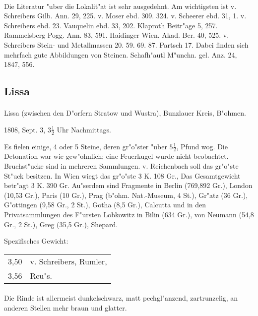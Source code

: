 \documentclass[a4paper, 11pt, oneside]{article}
\begin{document}
\paragraph{}
Die Literatur "uber die Lokalit"at ist sehr ausgedehnt. Am wichtigsten ist v. Schreibers Gilb. Ann. 29, 225. v. Moser ebd. 309. 324. v. Scheerer ebd. 31, 1. v. Schreibers ebd. 23. Vauquelin ebd. 33, 202. Klaproth Beitr"age 5, 257. Rammelsberg Pogg. Ann. 83, 591. Haidinger Wien. Akad. Ber. 40, 525. v. Schreibers Stein- und Metallmassen 20. 59. 69. 87. Partsch 17. Dabei finden sich mehrfach gute Abbildungen von Steinen. Schafh"autl M"unchn. gel. Anz. 24, 1847, 556.
\subsection{Lissa}
\normalsize
\paragraph{}
Lissa (zwischen den D"orfern Stratow und Wustra), Bunzlauer Kreis, B"ohmen.

1808, Sept. 3, $3\frac{1}{2}$ Uhr Nachmittags.

Es fielen einige, 4 oder 5 Steine, deren gr"o"ster "uber $5\frac{1}{2}$, Pfund wog. Die Detonation war wie gew"ohnlich; eine Feuerkugel wurde nicht beobachtet. Bruchst"ucke sind in mehreren Sammlungen. v. Reichenbach soll das gr"o"ste St"uck besitzen. In Wien wiegt das gr"o"ste 3 K. 108 Gr., Das Gesamtgewicht betr"agt 3 K. 390 Gr. Au"serdem sind Fragmente in Berlin (769,892 Gr.), London (10,53 Gr.), Paris (10 Gr.), Prag (b"ohm. Nat.-Museum, 4 St.), Gr"atz (36 Gr.), G"ottingen (9,58 Gr., 2 St.), Gotha (8,5 Gr.), Calcutta und in den Privatsammlungen des F"ursten Lobkowitz in Bilin (634 Gr.), von Neumann (54,8 Gr., 2 St.), Greg (35,5 Gr.), Shepard.

Spezifisches Gewicht:
\begin{table}[!ht]
    \centering
    \begin{tabular}{l l}
        3,50 & v. Schreibers, Rumler,\\
        3,56 & Reu"s.
    \end{tabular}
\end{table}
\paragraph{}
Die Rinde ist allermeist dunkelschwarz, matt pechgl"anzend, zartrunzelig, an anderen Stellen mehr braun und glatter.
\end{document}
